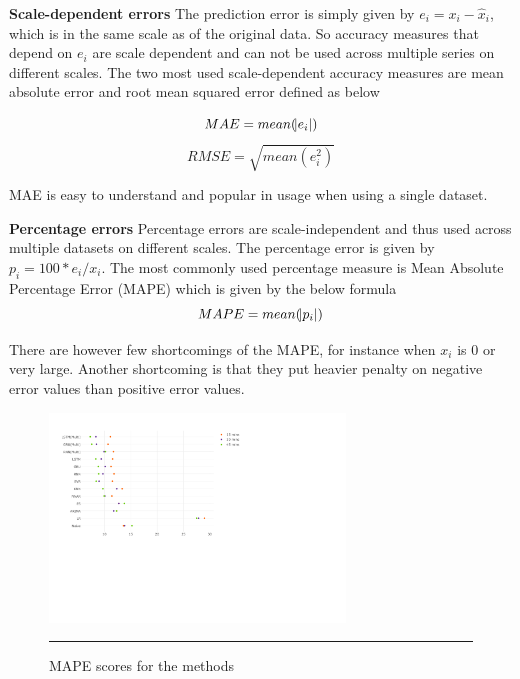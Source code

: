 \textbf{Scale-dependent errors}
The prediction error is simply given by $e_{i} = x_{i} - \hat{x}_{i}$, which is in the same scale
as of the original data. So accuracy measures that depend on $e_{i}$ are scale dependent and can
not be used across multiple series on different scales. The two most used scale-dependent
accuracy measures are mean absolute error and root mean squared error defined as below

    \begin{equation}
        MAE = mean(\abs{e_{i}})
    \end{equation}
    \begin{equation}
        RMSE = \sqrt{mean(e^{2}_{i})}
    \end{equation}

MAE is easy to understand and popular in usage when using a single dataset.

\textbf{Percentage errors}
Percentage errors are scale-independent and thus used across multiple datasets on different
scales. The percentage error is given by $p_{i} = 100*e_{i}/x_{i}$. The most commonly used
percentage measure is Mean Absolute Percentage Error (MAPE) which is given by the below formula
    \begin{equation}
        MAPE = mean(\abs{p_{i}})
    \end{equation}

There are however few shortcomings of the MAPE, for instance when $x_{i}$ is 0 or very large.
Another shortcoming is that they put heavier penalty on negative error values than positive error
values.

\begin{figure}[htbp]
    \centering
    \includegraphics[width=0.7\textwidth]{Plots/mape-errors.pdf}
    \rule{35em}{0.5pt}
    \caption[MAPE scores for the methods]{MAPE scores for the methods}
    \label{fig:mapeErrors}
\end{figure}

